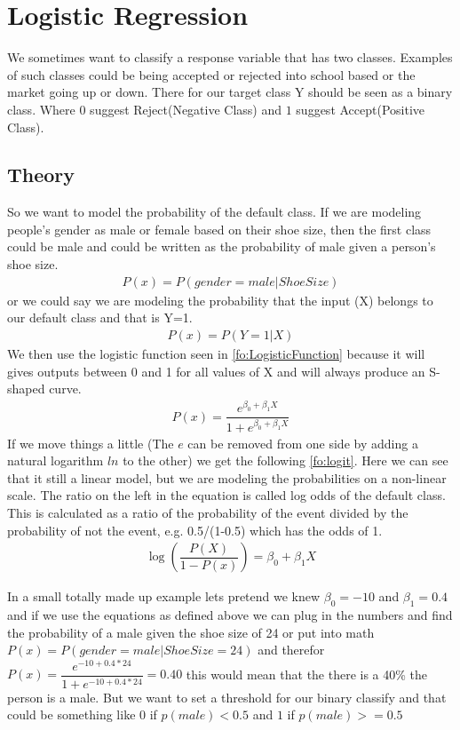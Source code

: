 \section{Logistic Regression}\label{sc:logisticRegression}
We sometimes want to classify a response variable that has two classes. Examples of such classes could be being accepted or rejected into school based or the market going up or down. There for our target class Y should be seen as a binary class. Where $0$ suggest Reject(Negative Class) and $1$ suggest Accept(Positive Class).
\subsection{Theory}
So we want to model the probability of the default class. If we are modeling people’s gender as male or female based on their shoe size, then the first class could be male and could be written as the probability of male given a person’s shoe size.
\begin{align}\label{fo:logit}
P(x) = P(gender=male|ShoeSize)
\end{align}
or we could say we are modeling the probability that the input (X) belongs to our default class and that is Y=1.
\begin{align}\label{fo:probability}
P(x) = P(Y=1|X)
\end{align}
We then use the logistic function seen in \ref{fo:LogisticFunction} because it will gives outputs between 0 and 1 for all values of X and will always produce an S-shaped curve.
\begin{align}\label{fo:LogisticFunction}
P(x) = \dfrac{ e^{\beta_0 + \beta_1 X}}{  1 + e^{\beta_0 + \beta_1 X}}
\end{align}
If we move things a little (The $e$ can be removed from one side by adding a natural logarithm $ln$ to the other) we get the following \ref{fo:logit}. Here we can see that it still a linear model, but we are modeling the probabilities on a non-linear scale.
The ratio on the left in the equation is called log odds of the default class. This is calculated as a ratio of the probability of the event divided by the probability of not the event, e.g. 0.5/(1-0.5) which has the odds of 1.
 \begin{align}\label{fo:logit}
\log( \dfrac{ P(X)}{1-P(x)} ) = \beta_0 + \beta_1 X
\end{align}

In a small totally made up example lets pretend we knew $\beta_0 = -10 $ and $ \beta_1 = 0.4 $ and if we use the equations as defined above we can plug in the numbers and find the probability of a male given the shoe size of 24 or put into math $P(x) = P(gender=male|ShoeSize=24)$ and therefor $P(x) = \dfrac{ e^{-10 + 0.4*24}}{1 + e^{-10 + 0.4*24}} = 0.40$ this would mean that the there is a 40\% the person is a male. But we want to set a threshold for our binary classify and that could be something like $0$ if $p(male) < 0.5$ and $1$ if $ p(male) >= 0.5$


